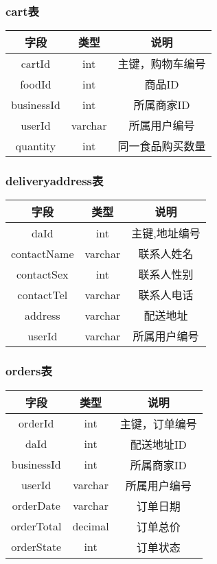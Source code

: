 \subsubsection{cart表}
\begin{tabular}{c|c|c}
    \hline
    字段         & 类型      & 说明       \\
    \hline
    cartId     & int     & 主键，购物车编号 \\
    \hline
    foodId     & int     & 商品ID     \\
    \hline
    businessId & int     & 所属商家ID   \\
    \hline
    userId     & varchar & 所属用户编号   \\
    \hline
    quantity   & int     & 同一食品购买数量 \\
\end{tabular}

\subsubsection{deliveryaddress表}
\begin{tabular}{c|c|c}
    \hline
    字段          & 类型      & 说明      \\
    \hline
    daId        & int     & 主键,地址编号 \\
    \hline
    contactName & varchar & 联系人姓名   \\
    \hline
    contactSex  & int     & 联系人性别   \\
    \hline
    contactTel  & varchar & 联系人电话   \\
    \hline
    address     & varchar & 配送地址    \\
    \hline
    userId      & varchar & 所属用户编号  \\
\end{tabular}

\subsubsection{orders表}
\begin{tabular}{c|c|c}
    \hline
    字段         & 类型      & 说明      \\
    \hline
    orderId    & int     & 主键，订单编号 \\
    \hline
    daId       & int     & 配送地址ID  \\
    \hline
    businessId & int     & 所属商家ID  \\
    \hline
    userId     & varchar & 所属用户编号  \\
    \hline
    orderDate  & varchar & 订单日期    \\
    \hline
    orderTotal & decimal & 订单总价    \\
    \hline
    orderState & int     & 订单状态    \\
\end{tabular}


